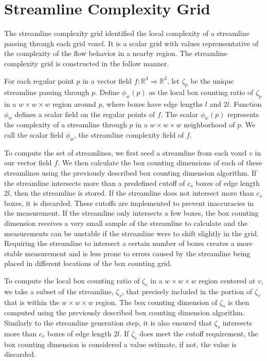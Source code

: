 \documentclass{egpubl}
\newcommand {\emath}[1]  {\ensuremath{#1}}
\newcommand {\Real}[1]   {\emath{\mathbb{R}^{#1}}}   %
\newcommand {\Rthree}    {\Real{3}}                  %
\newcommand {\gDim}[1]   {\emath{#1 \times #1 \times #1}} %
\begin{document}
\section{Streamline Complexity Grid} \label{sec:scg}

The streamline complexity grid identified the local complexity of a streamline passing through each grid voxel.
It is a scalar grid with values reprensentative of the complexity of the flow behavior in a nearby region.
The streamline complexity grid is constructed in the follow manner.

For each regular point $p$ in a vector field $f: \Rthree \Rightarrow \Rthree$,
let $\zeta_p$ be the unique streamline passing through $p$.
Define $\phi_w(p)$ as the local box counting ratio of $\zeta_p$
in a $\gDim{w}$ region around $p$,
where boxes have edge lengths $l$ and $2l$.
Function $\phi_w$ defines a scalar field on the regular points of $f$.
The scalar $\phi_w(p)$ represents the complexity of a streamline through $p$ in a $\gDim{w}$ neighborhood of $p$.
We call the scalar field $\phi_w$, the streamline complexity field of $f$.

To compute the set of streamlines, we first seed a streamline from each voxel $v$ in our vector field $f$.
We then calculate the box counting dimensions of each of these streamlines using the previously described box counting dimension algorithm.
If the streamline intersects more than a predefined cutoff of $c_s$ boxes of edge length $2l$, then the streamline is stored.
If the streamline does not intersect more than $c_s$ boxes, it is discarded.
These cutoffs are implemented to prevent inaccuracies in the measurement.
If the streamline only intersects a few boxes, the box counting dimension receives a very small sample of the streamline to calculate and the measurements can be unstable if the streamline were to shift slightly in the grid.
Requiring the streamline to intersect a certain number of boxes creates a more stable measurement and is less prone to errors caused by the streamline being placed in different locations of the box counting grid.

To compute the local box counting ratio of $\zeta_v$ in a $\gDim{w}$ region centered at $v$, we take a subset of the streamline, $\zeta_s$, that precisely included in the portion of $\zeta_v$ that is within the $\gDim{w}$ region.
The box counting dimension of $\zeta_s$ is then computed using the previously described box counting dimension algorithm.
Similarly to the streamline generation step, it is also ensured that $\zeta_s$ intersects more than $c_v$ boxes of edge length $2l$.
If $\zeta_s$ does meet the cutoff requirement, the box counting dimension is considered a value estimate, if not, the value is discarded.
\end{document}
